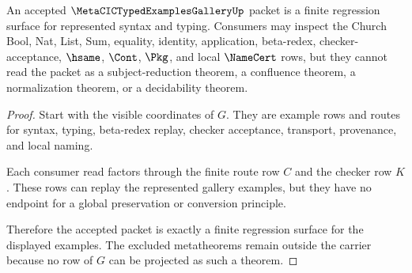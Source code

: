 \begin{theorem}
\label{thm:metacic-typedexamples-gallery-regression-surface}
An accepted $\MetaCICTypedExamplesGalleryUp$ packet is a finite regression surface for represented syntax and typing. Consumers may inspect the Church Bool, Nat, List, Sum, equality, identity, application, beta-redex, checker-acceptance, $\hsame$, $\Cont$, $\Pkg$, and local $\NameCert$ rows, but they cannot read the packet as a subject-reduction theorem, a confluence theorem, a normalization theorem, or a decidability theorem.
\end{theorem}
\begin{proof}
Start with the visible coordinates of $G$. They are example rows and routes for syntax, typing, beta-redex replay, checker acceptance, transport, provenance, and local naming.

Each consumer read factors through the finite route row $C$ and the checker row $K$. These rows can replay the represented gallery examples, but they have no endpoint for a global preservation or conversion principle.

Therefore the accepted packet is exactly a finite regression surface for the displayed examples. The excluded metatheorems remain outside the carrier because no row of $G$ can be projected as such a theorem.
\end{proof}

